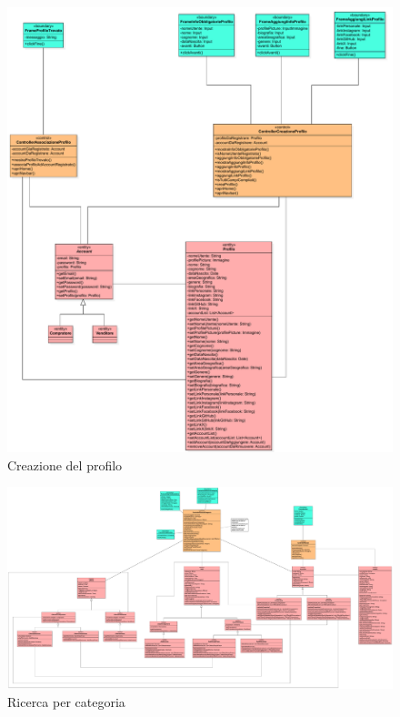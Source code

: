             \begin{figure}[htbp!]
                \centering
                    \includegraphics[width=1\linewidth]{Immagini/Diagrammi/Class Diagram/Utente che non ha effettuato l'accesso/CreazioneProfilo.pdf}
                \caption{Creazione del profilo}
            \end{figure}
            
            \begin{figure}[htbp!]
                \centering
                    \includegraphics[width=1\linewidth]{Immagini/Diagrammi/Class Diagram/Utente generico/RicercaCategoria.pdf}
                \caption{Ricerca per categoria}
            \end{figure}
            

